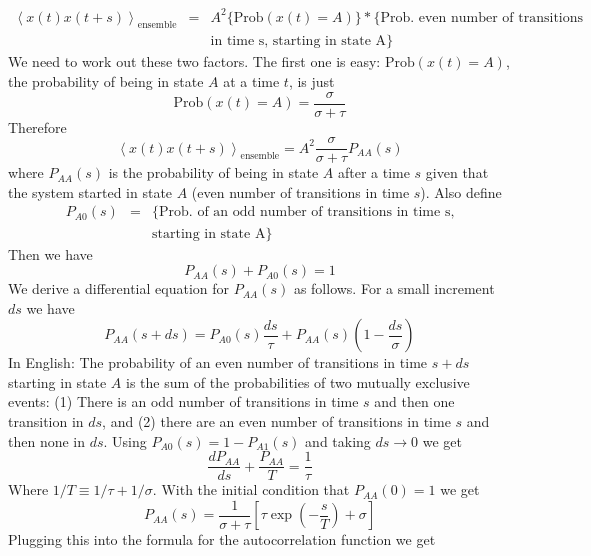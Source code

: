 \documentclass{article}
\newcommand{\avg}[1]{\left \langle #1 \right \rangle}
\begin{document}
\begin{eqnarray*}
  \avg{x(t)x(t+s)}_{\textrm{ensemble}} & = & A^{2}\{\textrm{Prob}(x(t)=A)\}*\{\textrm{Prob. even number of transitions} \\
  & ~ & \textrm{in time s, starting in state A}\}
\end{eqnarray*}
We need to work out these two factors. The first one is easy: $\textrm{Prob}(x(t)=A)$, the probability of being in state $A$ at a time $t$, is just
\begin{equation*}
  \textrm{Prob}(x(t)=A)=\frac{\sigma}{\sigma+\tau}
\end{equation*}
Therefore
\begin{equation*}
  \avg{x(t)x(t+s)}_{\textrm{ensemble}}=A^{2}\frac{\sigma}{\sigma+\tau}P_{AA}(s)
\end{equation*}
where $P_{AA}(s)$ is the probability of being in state $A$ after a time $s$ given that the system started in state $A$ (even number of transitions in time $s$).
Also define
\begin{eqnarray*}
  P_{A0}(s) & = & \{\textrm{Prob. of an odd number of transitions in time s,}\\
  & ~ & \textrm{starting in state A}\}
\end{eqnarray*}
Then we have
\begin{equation*}
  P_{AA}(s)+P_{A0}(s)=1
\end{equation*}
We derive a differential equation for $P_{AA}(s)$ as follows.
For a small increment $ds$ we have
\begin{equation*}
  P_{AA}(s+ds) = P_{A0}(s)\frac{ds}{\tau}+P_{AA}(s) \left( 1-\frac{ds}{\sigma} \right)
\end{equation*}
In English: The probability of an even number of transitions in time $s+ds$ starting in state $A$ is the sum of the probabilities of two mutually exclusive events:
(1) There is an odd number of transitions in time $s$ and then one transition in $ds$, and
(2) there are an even number of transitions in time $s$ and then none in $ds$.
Using $P_{A0}(s)=1-P_{A1}(s)$ and taking $ds\rightarrow0$ we get
\begin{equation*}
  \frac{dP_{AA}}{ds}+\frac{P_{AA}}{T} = \frac{1}{\tau}
\end{equation*}
Where $1/T \equiv 1/\tau + 1/\sigma$. With the initial condition that $P_{AA}(0)=1$ we get
\begin{equation*}
  P_{AA}(s)=\frac{1}{\sigma+\tau}\left[\tau\exp\left(-\frac{s}{T}\right)+\sigma\right]
\end{equation*}
Plugging this into the formula for the autocorrelation function we get
\end{document}
